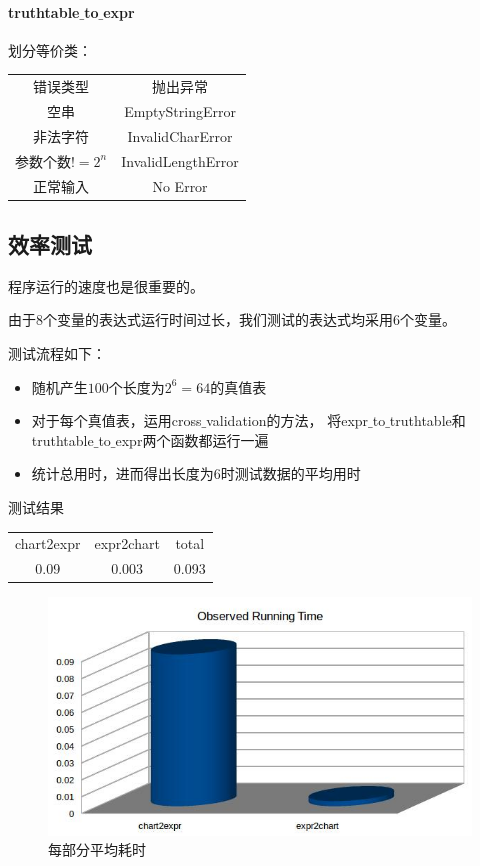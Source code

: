 	\paragraph{truthtable$\_$to$\_$expr\\}
		划分等价类：
		\begin{center}
			\begin{tabular}{cc}
				错误类型 & 抛出异常\\
				空串 & EmptyStringError\\
				非法字符 & InvalidCharError\\
				参数个数$!=2^n$ & InvalidLengthError\\
				正常输入 & No Error\\
		\end{tabular}				
		\end{center}

			
\subsection{效率测试}
	程序运行的速度也是很重要的。
	
	由于8个变量的表达式运行时间过长，我们测试的表达式均采用6个变量。
	
	测试流程如下：
		\begin{itemize}
			\item	随机产生$100$个长度为$2 ^ 6 = 64$的真值表
			\item	对于每个真值表，运用cross$\_$validation的方法，
					将expr$\_$to$\_$truthtable和truthtable$\_$to$\_$expr两个函数都运行一遍
			\item	统计总用时，进而得出长度为$6$时测试数据的平均用时
		\end{itemize}

		
		
	测试结果
	
		\begin{center}
			\begin{tabular}{ccc}
				chart2expr & expr2chart & total\\
				0.09 & 	0.003 &	0.093\\
			\end{tabular}
		\end{center}
	\begin{figure}[h]
		\centering
			\includegraphics[scale=0.8]{images/result.jpg}
			\caption{每部分平均耗时}
	\end{figure}